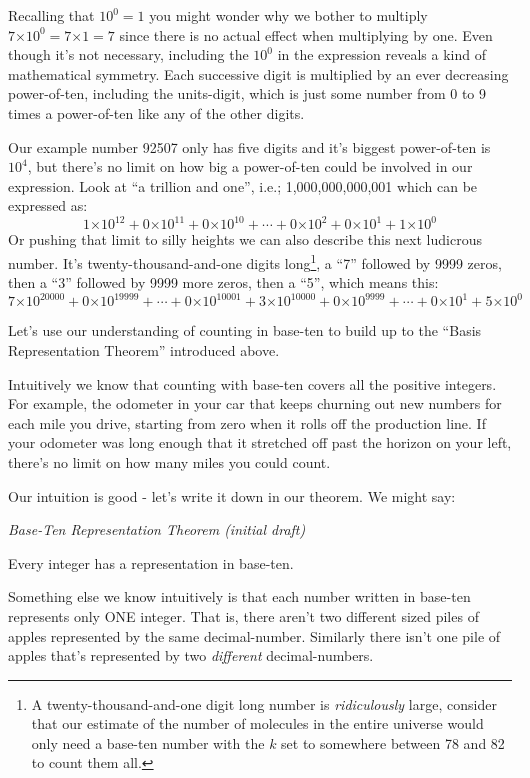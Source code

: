 \documentclass{article}
\newenvironment{jprIn}{\begin{adjustwidth}{2em}{}}{\end{adjustwidth}}
\begin{document}
Recalling that $10^0 = 1$ you might wonder why we bother to multiply
$7{\times{}}10^0=7{\times{}}1=7$ since there is no actual effect
when multiplying by one.
Even though it's not necessary, including the $10^0$ in the
expression reveals a kind of mathematical symmetry.
Each successive digit is multiplied by an ever
decreasing power-of-ten, including
the units-digit,
which is just some number from 0 to 9 times a power-of-ten
like any of the other digits.

Our example number 92507 only has five digits and it's biggest power-of-ten is $10^4$,
but there's
no limit on how big a power-of-ten could be involved in our expression.
Look at ``a trillion and one'', i.e.; 1,000,000,000,001 which can be expressed as:
\[1{\times{}}10^{12}
+0{\times{}}10^{11}
+0{\times{}}10^{10}
+\cdots{}
+0{\times{}}10^{2}
+0{\times{}}10^{1}
+1{\times{}}10^{0}\]
%
Or pushing that limit to silly heights we can also describe this next ludicrous number.
It's twenty-thousand-and-one digits long\footnote{A twenty-thousand-and-one digit long number is 
\emph{ridiculously} large,
consider that our estimate of the number of molecules in
the entire universe would only need a base-ten
number with the $k$ set to somewhere between 78 and 82 to count them all.}, a
``7'' followed by 9999 zeros, then a ``3''
followed by 9999 more zeros, then a ``5'', which means this:
\[7{\times{}}10^{20000}
+0{\times{}}10^{19999}
+\cdots{}
+0{\times{}}10^{10001}
+3{\times{}}10^{10000}
+0{\times{}}10^{9999}
+\cdots{}
+0{\times{}}10^{1}
+5{\times{}}10^{0}\]

Let's use our understanding of counting in base-ten to build up to the
``Basis Representation Theorem'' introduced above.

Intuitively we know that counting with
base-ten covers all the positive integers.
For example, the odometer in your car that keeps churning out
new numbers for each mile you drive, starting from zero when it rolls
off the production line.  If your odometer was long enough that it 
stretched off past the horizon on your left, there's no limit on
how many miles you could count.

Our intuition is good - let's write it down
in our theorem. We might say:

\emph{Base-Ten Representation Theorem (initial draft)}
\begin{jprIn}
Every integer has a representation in base-ten.
\end{jprIn}

Something else we know intuitively is that each number written
in base-ten represents only ONE integer. That is, there aren't two different
sized piles of apples represented by the same decimal-number. Similarly there
isn't one pile of apples that's represented by two \emph{different} decimal-numbers.
\end{document}

